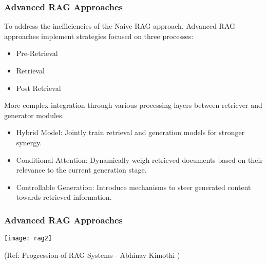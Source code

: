\begin{frame}[fragile]\frametitle{Advanced RAG Approaches}

To  address  the  inefficiencies  of  the  Naive  RAG  approach,  Advanced  RAG
approaches implement strategies focused on three processes:
\begin{itemize}
\item Pre-Retrieval
\item Retrieval
\item Post Retrieval
\end{itemize}	

More complex integration through various processing layers between retriever and generator modules.

\begin{itemize}
\item Hybrid Model: Jointly train retrieval and generation models for stronger synergy.
\item Conditional Attention: Dynamically weigh retrieved documents based on their relevance to the current generation stage.
\item Controllable Generation: Introduce mechanisms to steer generated content towards retrieved information.
\end{itemize}	

\end{frame}

\begin{frame}[fragile]\frametitle{Advanced RAG Approaches}

\begin{center}
\texttt{[image: rag2]}

{\tiny (Ref: Progression of RAG Systems - Abhinav Kimothi )}
\end{center}	
\end{frame}


